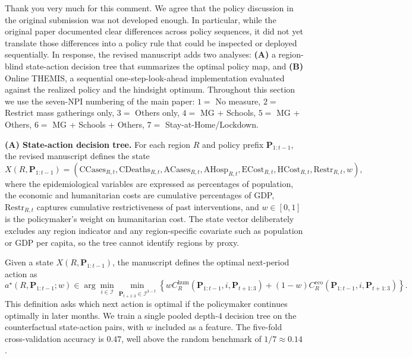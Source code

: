 \documentclass[letterpaper,twoside,11pt]{reviewresponse}
\begin{document}
Thank you very much for this comment. We agree that the policy discussion in the original submission was not developed enough. In particular, while the original paper documented clear differences across policy sequences, it did not yet translate those differences into a policy rule that could be inspected or deployed sequentially. In response, the revised manuscript adds two analyses: \textbf{(A)} a region-blind state-action decision tree that summarizes the optimal policy map, and \textbf{(B)} Online THEMIS, a sequential one-step-look-ahead implementation evaluated against the realized policy and the hindsight optimum. Throughout this section we use the seven-NPI numbering of the main paper: $1=$ No measure, $2=$ Restrict mass gatherings only, $3=$ Others only, $4=$ MG + Schools, $5=$ MG + Others, $6=$ MG + Schools + Others, $7=$ Stay-at-Home/Lockdown.

\textbf{(A) State-action decision tree.} For each region $R$ and policy prefix $\bm{P}_{1:t-1}$, the revised manuscript defines the state
\[
X(R,\bm{P}_{1:t-1})
=
\left(
\mathrm{CCases}_{R,t},
\mathrm{CDeaths}_{R,t},
\mathrm{ACases}_{R,t},
\mathrm{AHosp}_{R,t},
\mathrm{ECost}_{R,t},
\mathrm{HCost}_{R,t},
\mathrm{Restr}_{R,t},
w
\right),
\]
where the epidemiological variables are expressed as percentages of population, the economic and humanitarian costs are cumulative percentages of GDP, $\mathrm{Restr}_{R,t}$ captures cumulative restrictiveness of past interventions, and $w\in[0,1]$ is the policymaker's weight on humanitarian cost. The state vector deliberately excludes any region indicator and any region-specific covariate such as population or GDP per capita, so the tree cannot identify regions by proxy.

Given a state $X(R,\bm{P}_{1:t-1})$, the manuscript defines the optimal next-period action as
\[
a^\star(R,\bm{P}_{1:t-1};w)
\in \arg\min_{i\in\mathcal{I}}
\min_{\bm{P}_{t+1:3}\in\mathcal{I}^{3-t}}
\left\{
w C^{\mathrm{hum}}_R(\bm{P}_{1:t-1},i,\bm{P}_{t+1:3})
+(1-w)C^{\mathrm{eco}}_R(\bm{P}_{1:t-1},i,\bm{P}_{t+1:3})
\right\}.
\]
This definition asks which next action is optimal if the policymaker continues optimally in later months. We train a single pooled depth-$4$ decision tree on the counterfactual state-action pairs, with $w$ included as a feature. The five-fold cross-validation accuracy is $0.47$, well above the random benchmark of $1/7\approx0.14$.
\end{document}
